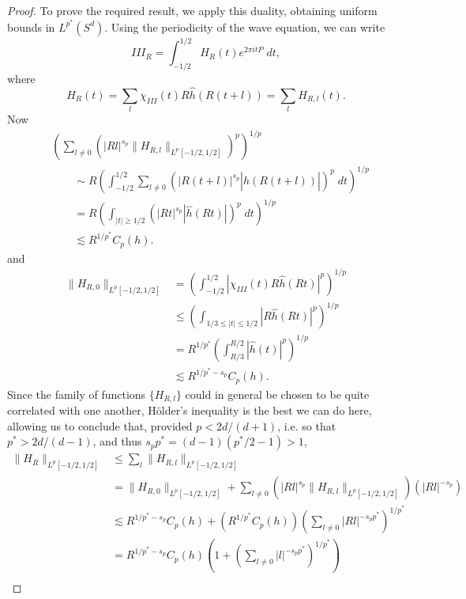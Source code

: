 \begin{proof}
    To prove the required result, we apply this duality, obtaining uniform bounds in $L^{p^*}(S^d)$. Using the periodicity of the wave equation, we can write
    \[ III_R = \int_{-1/2}^{1/2} H_R(t) e^{2 \pi i t P}\; dt, \]
    where
    \[ H_R(t) = \sum_l \chi_{III}(t) R \widehat{h}(R(t + l)) = \sum_l H_{R,l}(t). \]
    Now
    \begin{align*}
        &\left( \sum_{l \neq 0} \left( |Rl|^{s_p} \| H_{R,l} \|_{L^p[-1/2,1/2]} \right)^p \right)^{1/p}\\
        &\quad\quad \sim R \left( \int_{-1/2}^{1/2} \sum_{l \neq 0} \left( |R(t + l)|^{s_p} |\widehat{h}(R(t + l))| \right)^p\; dt \right)^{1/p}\\
        &\quad\quad = R \left( \int_{|t| \geq 1/2} \left( |Rt|^{s_p} |\widehat{h}(Rt)| \right)^p\; dt \right)^{1/p} \\
        &\quad\quad\lesssim R^{1/p^*} C_p(h).
    \end{align*}
    and
    \begin{align*}
        \| H_{R,0} \|_{L^p[-1/2,1/2]} &= \left( \int_{-1/2}^{1/2} |\chi_{III}(t) R \widehat{h}(Rt)|^p \right)^{1/p}\\
        &\leq \left( \int_{1/3 \leq |t| \leq 1/2} |R \widehat{h}(Rt)|^p \right)^{1/p}\\
        &= R^{1/p^*} \left( \int_{R/3}^{R/2} |\widehat{h}(t)|^p \right)^{1/p}\\
        &\lesssim R^{1/p^* - s_p} C_p(h).
    \end{align*}
    Since the family of functions $\{ H_{R,l} \}$ could in general be chosen to be quite correlated with one another, H\"{o}lder's inequality is the best we can do here, allowing us to conclude that, provided $p < 2d/(d+1)$, i.e. so that $p^* > 2d/(d-1)$, and thus $s_p p^* = (d-1)(p^*/2 - 1) > 1$,
    \begin{align*}
        \| H_R \|_{L^p[-1/2,1/2]} &\leq \sum_l \| H_{R,l} \|_{L^p[-1/2,1/2]}\\
        &= \| H_{R,0} \|_{L^p[-1/2,1/2]} + \sum_{l \neq 0} \left( |Rl|^{s_p} \| H_{R,l} \|_{L^p[-1/2,1/2]} \right) \left( |Rl|^{-s_p} \right)\\
        &\lesssim R^{1/p^* - s_p} C_p(h) + ( R^{1/p^*} C_p(h) ) \left( \sum_{l \neq 0} |Rl|^{-s_p p^*} \right)^{1/p^*}\\
        &= R^{1/p^* - s_p} C_p(h) \left( 1 + \left( \sum_{l \neq 0} |l|^{-s_p p^*} \right)^{1/p^*} \right)\\

\end{align*}
\end{proof}
